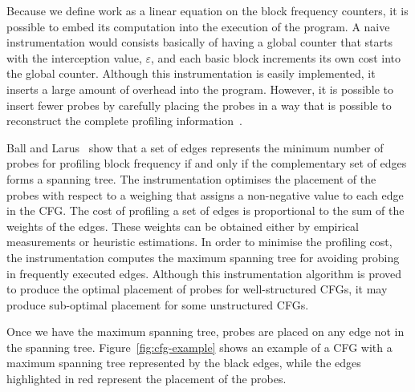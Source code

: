 \documentclass[sigplan,10pt]{acmart}
\begin{document}
Because we define work as a linear equation on the block frequency counters, it is possible to embed its computation into the execution of the program.
A naive instrumentation would consists basically of having a global counter that starts with the interception value, $\varepsilon$, and each basic block increments its own cost into the global counter.
Although this instrumentation is easily implemented, it inserts a large amount of overhead into the program.
However, it is possible to insert fewer probes by carefully placing the probes in a way that is possible to reconstruct the complete profiling information~\cite{knuth73,ball94}.

Ball and Larus~\cite{ball94} show that a set of edges represents the minimum number of probes for profiling block frequency if and only if the complementary set of edges forms a spanning tree.
The instrumentation optimises the placement of the probes with respect to a weighing that assigns a non-negative value to each edge in the CFG.
The cost of profiling a set of edges is proportional to the sum of the weights of the edges.
These weights can be obtained either by empirical measurements or heuristic estimations.
In order to minimise the profiling cost, the instrumentation computes the maximum spanning tree for avoiding probing in frequently executed edges.
Although this instrumentation algorithm is proved to produce the optimal placement of probes for well-structured CFGs, it may produce sub-optimal placement for some unstructured CFGs.

Once we have the maximum spanning tree, probes are placed on any edge not in the spanning tree. Figure~\ref{fig:cfg-example} shows an example of a CFG with a maximum spanning tree represented by the black edges, while the edges highlighted in red represent the placement of the probes.
\end{document}
